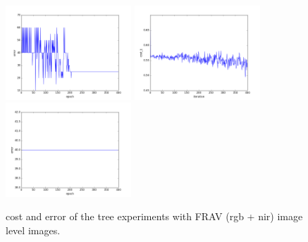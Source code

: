\begin{figure}[htb]
\includegraphics[width=0.42\textwidth]{images/redes/ejecucion1/general_svm_frav_rgb_nir/minidataset_tested_itself/error.png}
\includegraphics[width=0.42\textwidth]{images/redes/ejecucion1/general_svm_frav_rgb_nir/minidataset_tested_iteself_lr_0_001/cost.png}
\includegraphics[width=0.42\textwidth]{images/redes/ejecucion1/general_svm_frav_rgb_nir/minidataset_tested_iteself_lr_0_001/error.png}
\caption{cost and error of the tree experiments with FRAV (rgb + nir) image level images.} \label{fig:frav_imagelevel-ejec1}
\end{figure}

